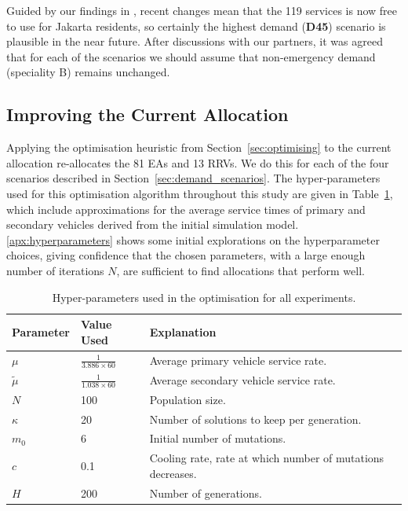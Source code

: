 \documentclass[preprint,12pt]{elsarticle}
\begin{document}
Guided by our findings in \cite{BriceSyaribahNoor2022Esui}, recent changes
mean that the 119 services is now free to use for Jakarta residents, so
certainly the highest demand (\textbf{D45}) scenario is plausible in the near
future. After discussions with our partners, it was agreed that for each of
the scenarios we should assume that non-emergency demand (speciality B)
remains unchanged.


\subsection{Improving the Current Allocation}\label{sec:optimise_current}
Applying the optimisation heuristic from Section~\ref{sec:optimising} to the
current allocation re-allocates the 81 EAs and 13 RRVs. We do this for each of
the four scenarios described in Section~\ref{sec:demand_scenarios}. The
hyper-parameters used for this optimisation algorithm throughout this study are
given in Table~\ref{tbl:hyperparameters}, which include approximations for the
average service times of primary and secondary vehicles derived from the initial
simulation model. \ref{apx:hyperparameters} shows some initial explorations on
the hyperparameter choices, giving confidence that the chosen parameters, with
a large enough number of iterations $N$, are sufficient to find allocations
that perform well.

\begin{table}
\begin{tabular}{lll}
\toprule
Parameter & Value Used & Explanation \\
\midrule
$\mu$ & $\frac{1}{3.886 \times 60}$ & Average primary vehicle service rate.\\
$\tilde{\mu}$ & $\frac{1}{1.038 \times 60}$ & Average secondary vehicle service rate.\\
$N$ & 100 & Population size.\\
$\kappa$ & 20 & Number of solutions to keep per generation.\\
$m_0$ & 6 & Initial number of mutations.\\
$c$ & 0.1 & Cooling rate, rate at which number of mutations decreases.\\
$H$ & 200 & Number of generations.\\
\bottomrule
\end{tabular}
\caption{Hyper-parameters used in the optimisation for all experiments.}
\label{tbl:hyperparameters}
\end{table}
\end{document}

